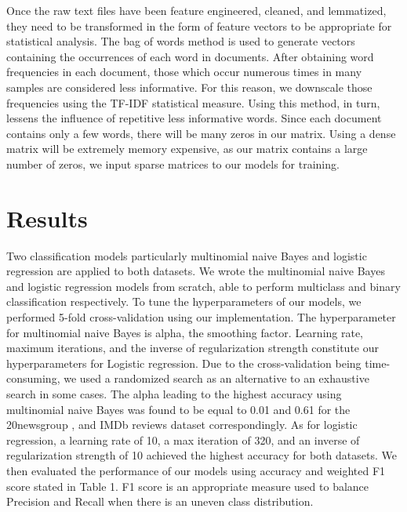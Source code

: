 \documentclass[10pt]{article}
\begin{document}
Once the raw text files have been feature engineered, cleaned, and lemmatized, they need to be transformed in the form of feature vectors to be appropriate for statistical analysis. The bag of words method is used to generate vectors containing the occurrences of each word in documents. After obtaining word frequencies in each document, those which occur numerous times in many samples are considered less informative. For this reason, we downscale those frequencies using the TF-IDF statistical measure. Using this method, in turn, lessens the influence of repetitive less informative words. Since each document contains only a few words, there will be many zeros in our matrix. Using a dense matrix will be extremely memory expensive, as our matrix contains a large number of zeros, we input sparse matrices to our models for training.

\section{Results}
Two classification models particularly multinomial naive Bayes and logistic regression are applied to both datasets. We wrote the multinomial naive Bayes and logistic regression models from scratch, able to perform multiclass and binary classification respectively. To tune the hyperparameters of our models, we performed 5-fold cross-validation using our implementation. The hyperparameter for multinomial naive Bayes is alpha, the smoothing factor. Learning rate, maximum iterations, and the inverse of regularization strength constitute our hyperparameters for Logistic regression. Due to the cross-validation being time-consuming, we used a randomized search as an alternative to an exhaustive search in some cases. The alpha leading to the highest accuracy using multinomial naive Bayes was found to be equal to 0.01 and 0.61 for the 20newsgroup , and IMDb reviews dataset correspondingly.  As for logistic regression, a learning rate of 10, a max iteration of 320, and an inverse of regularization strength of 10 achieved the highest accuracy for both datasets. We then evaluated the performance of our models using accuracy and weighted F1 score stated in Table 1. F1 score is an appropriate measure used to balance Precision and Recall when there is an uneven class distribution.
\end{document}
